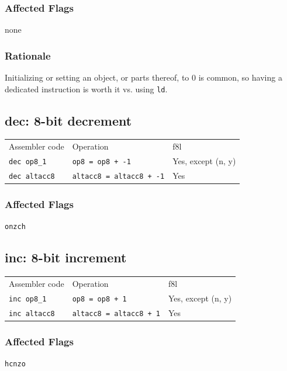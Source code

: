 \documentclass{book}
\begin{document}
\subsubsection*{Affected Flags}

none

\subsubsection*{Rationale}

Initializing or setting an object, or parts thereof, to 0 is common, so having a dedicated instruction is worth it vs. using \texttt{ld}.


\subsection{dec: 8-bit decrement}

\begin{tabular}{l l l}
Assembler code       & Operation                       & f8l \\
\texttt{dec op8\_1}  & \texttt{op8 = op8 + -1}         & Yes, except (n, y) \\
\texttt{dec altacc8} & \texttt{altacc8 = altacc8 + -1} & Yes
\end{tabular}

\subsubsection*{Affected Flags}

\texttt{onzch}


\subsection{inc: 8-bit increment}

\begin{tabular}{l l l}
Assembler code       & Operation                      & f8l \\
\texttt{inc op8\_1}  & \texttt{op8 = op8 + 1}         & Yes, except (n, y) \\
\texttt{inc altacc8} & \texttt{altacc8 = altacc8 + 1} & Yes
\end{tabular}

\subsubsection*{Affected Flags}

\texttt{hcnzo}
\end{document}
